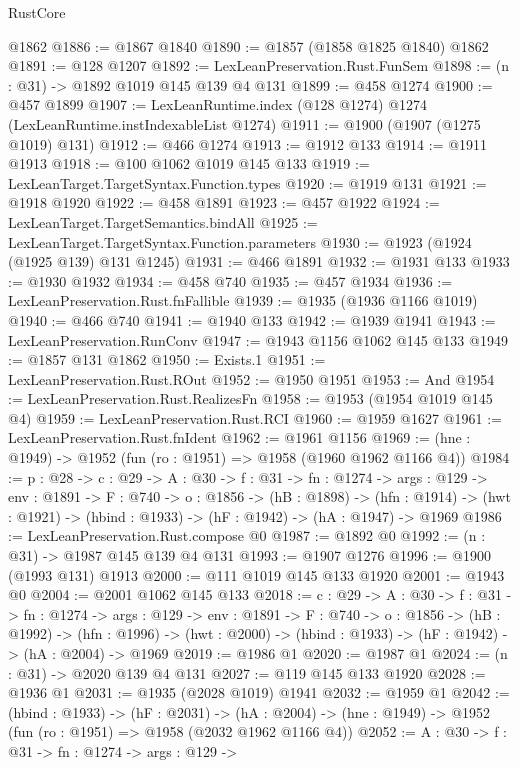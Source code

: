 \begin{lexlean}{RustCore}
\begin{coremodule}
    @1862
@1886 := @1867 @1840
@1890 := @1857 (@1858 @1825 @1840) @1862
@1891 := @128 @1207
@1892 := LexLeanPreservation.Rust.FunSem
@1898 := (n : @31) -> @1892 @1019 @145 @139 @4 @131
@1899 := @458 @1274
@1900 := @457 @1899
@1907 := LexLeanRuntime.index (@128 @1274) @1274 (LexLeanRuntime.instIndexableList @1274)
@1911 := @1900 (@1907 (@1275 @1019) @131)
@1912 := @466 @1274
@1913 := @1912 @133
@1914 := @1911 @1913
@1918 := @100 @1062 @1019 @145 @133
@1919 := LexLeanTarget.TargetSyntax.Function.types
@1920 := @1919 @131
@1921 := @1918 @1920
@1922 := @458 @1891
@1923 := @457 @1922
@1924 := LexLeanTarget.TargetSemantics.bindAll
@1925 := LexLeanTarget.TargetSyntax.Function.parameters
@1930 := @1923 (@1924 (@1925 @139) @131 @1245)
@1931 := @466 @1891
@1932 := @1931 @133
@1933 := @1930 @1932
@1934 := @458 @740
@1935 := @457 @1934
@1936 := LexLeanPreservation.Rust.fnFallible
@1939 := @1935 (@1936 @1166 @1019)
@1940 := @466 @740
@1941 := @1940 @133
@1942 := @1939 @1941
@1943 := LexLeanPreservation.RunConv
@1947 := @1943 @1156 @1062 @145 @133
@1949 := @1857 @131 @1862
@1950 := Exists.{1}
@1951 := LexLeanPreservation.Rust.ROut
@1952 := @1950 @1951
@1953 := And
@1954 := LexLeanPreservation.Rust.RealizesFn
@1958 := @1953 (@1954 @1019 @145 @4)
@1959 := LexLeanPreservation.Rust.RCI
@1960 := @1959 @1627
@1961 := LexLeanPreservation.Rust.fnIdent
@1962 := @1961 @1156
@1969 := (hne : @1949) -> @1952 (fun (ro : @1951) => @1958 (@1960 @1962 @1166 @4))
@1984 := {p : @28} ->
  {c : @29} ->
  {A : @30} ->
  {f : @31} ->
  {fn : @1274} ->
  {args : @129} ->
  {env : @1891} ->
  {F : @740} ->
  {o : @1856} ->
  (hB : @1898) ->
  (hfn : @1914) -> (hwt : @1921) -> (hbind : @1933) -> (hF : @1942) -> (hA : @1947) -> @1969
@1986 := LexLeanPreservation.Rust.compose @0
@1987 := @1892 @0
@1992 := (n : @31) -> @1987 @145 @139 @4 @131
@1993 := @1907 @1276
@1996 := @1900 (@1993 @131) @1913
@2000 := @111 @1019 @145 @133 @1920
@2001 := @1943 @0
@2004 := @2001 @1062 @145 @133
@2018 := {c : @29} ->
  {A : @30} ->
  {f : @31} ->
  {fn : @1274} ->
  {args : @129} ->
  {env : @1891} ->
  {F : @740} ->
  {o : @1856} ->
  (hB : @1992) ->
  (hfn : @1996) -> (hwt : @2000) -> (hbind : @1933) -> (hF : @1942) -> (hA : @2004) -> @1969
@2019 := @1986 @1
@2020 := @1987 @1
@2024 := (n : @31) -> @2020 @139 @4 @131
@2027 := @119 @145 @133 @1920
@2028 := @1936 @1
@2031 := @1935 (@2028 @1019) @1941
@2032 := @1959 @1
@2042 := (hbind : @1933) ->
  (hF : @2031) ->
  (hA : @2004) -> (hne : @1949) -> @1952 (fun (ro : @1951) => @1958 (@2032 @1962 @1166 @4))
@2052 := {A : @30} ->
  {f : @31} ->
  {fn : @1274} ->
  {args : @129} ->

\end{coremodule}
\end{lexlean}
